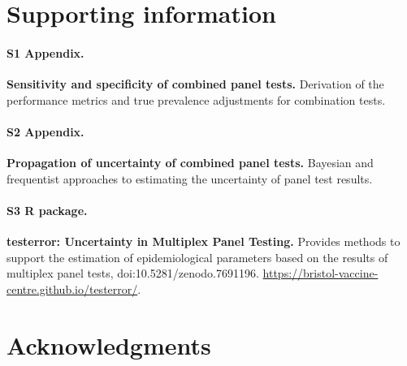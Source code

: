 \documentclass[10pt,letterpaper]{article}
\begin{document}
\section*{Supporting information}


\paragraph*{S1 Appendix.}
\label{S1_Appendix}
{\bf Sensitivity and specificity of combined panel tests.} Derivation of the performance metrics and true prevalence adjustments for combination tests.

\paragraph*{S2 Appendix.}
\label{S2_Appendix}
{\bf Propagation of uncertainty of combined panel tests.} Bayesian and frequentist approaches to estimating the uncertainty of panel test results.

\paragraph*{S3 R package.}
\label{S3_Github}
{\bf testerror: Uncertainty in Multiplex Panel Testing.}  Provides methods to support the estimation of epidemiological parameters based on the results of multiplex panel tests, doi:10.5281/zenodo.7691196. \url{https://bristol-vaccine-centre.github.io/testerror/}.




\section*{Acknowledgments}


\nolinenumbers
\end{document}
